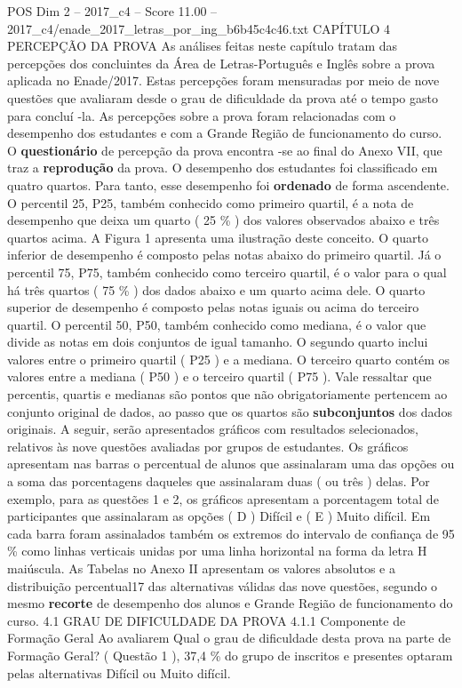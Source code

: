 \begin{textsample}{POS Dim 2 – 2017\_c4 – Score 11.00 – 2017\_c4/enade\_2017\_letras\_por\_ing\_b6b45c4c46.txt}  \label{ex:f2_pos_093}
CAPÍTULO 4 PERCEPÇÃO DA PROVA As análises feitas neste capítulo tratam das percepções dos concluintes da Área de Letras-Português e Inglês sobre a prova aplicada no Enade/2017.
Estas percepções foram mensuradas por meio de nove questões que avaliaram desde o grau de dificuldade da prova até o tempo gasto para concluí -la.
As percepções sobre a prova foram relacionadas com o desempenho dos estudantes e com a Grande Região de funcionamento do curso.
O \textbf{questionário} de percepção da prova encontra -se ao final do Anexo VII, que traz a \textbf{reprodução} da prova.
O desempenho dos estudantes foi classificado em quatro quartos.
Para tanto, esse desempenho foi \textbf{ordenado} de forma ascendente.
O percentil 25, P25, também conhecido como primeiro quartil, é a nota de desempenho que deixa um quarto ( 25 \% ) dos valores observados abaixo e três quartos acima.
A Figura 1 apresenta uma ilustração deste conceito.
O quarto inferior de desempenho é composto pelas notas abaixo do primeiro quartil.
Já o percentil 75, P75, também conhecido como terceiro quartil, é o valor para o qual há três quartos ( 75 \% ) dos dados abaixo e um quarto acima dele.
O quarto superior de desempenho é composto pelas notas iguais ou acima do terceiro quartil.
O percentil 50, P50, também conhecido como mediana, é o valor que divide as notas em dois conjuntos de igual tamanho.
O segundo quarto inclui valores entre o primeiro quartil ( P25 ) e a mediana.
O terceiro quarto contém os valores entre a mediana ( P50 ) e o terceiro quartil ( P75 ).
Vale ressaltar que percentis, quartis e medianas são pontos que não obrigatoriamente pertencem ao conjunto original de dados, ao passo que os quartos são \textbf{subconjuntos} dos dados originais.
A seguir, serão apresentados gráficos com resultados selecionados, relativos às nove questões avaliadas por grupos de estudantes.
Os gráficos apresentam nas barras o percentual de alunos que assinalaram uma das opções ou a soma das porcentagens daqueles que assinalaram duas ( ou três ) delas.
Por exemplo, para as questões 1 e 2, os gráficos apresentam a porcentagem total de participantes que assinalaram as opções ( D ) Difícil e ( E ) Muito difícil.
Em cada barra foram assinalados também os extremos do intervalo de confiança de 95 \% como linhas verticais unidas por uma linha horizontal na forma da letra H maiúscula.
As Tabelas no Anexo II apresentam os valores absolutos e a distribuição percentual17 das alternativas válidas das nove questões, segundo o mesmo \textbf{recorte} de desempenho dos alunos e Grande Região de funcionamento do curso. 4.1 GRAU DE DIFICULDADE DA PROVA 4.1.1 Componente de Formação Geral Ao avaliarem Qual o grau de dificuldade desta prova na parte de Formação Geral? ( Questão 1 ), 37,4 \% do grupo de inscritos e presentes optaram pelas alternativas Difícil ou Muito difícil.

\end{textsample}
